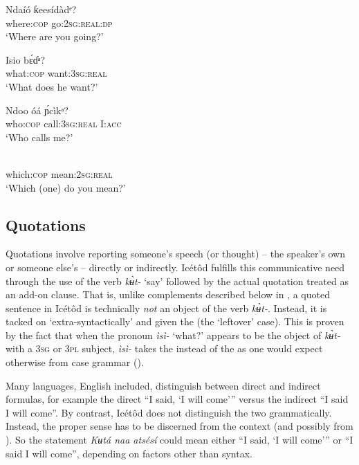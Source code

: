 \ea\label{ex:syn:48}
\gll Ndaíó   ƙeesídàdᵉ? \\
where:\textsc{cop}   go:\textsc{2sg:real:dp}    \\
\glt ‘Where are you going?’ 
\z




\ea\label{ex:syn:49}
\gll Isio     b\'{ɛ}ɗᵃ? \\
what:\textsc{cop}   want:\textsc{3sg:real}    \\
\glt ‘What does he want?’ 
\z




\ea\label{ex:syn:50}
\gll Ndoo     óá       \'{ɲ}cìkᵃ? \\
who:\textsc{cop}   call:\textsc{3sg:real}   I:\textsc{acc}    \\
\glt ‘Who calls me?’ 
\z




\ea\label{ex:syn:51}
 \\
which:\textsc{cop}   mean:\textsc{2sg:real}    \\
\glt ‘Which (one) do you mean?’ 
\z






\subsection{Quotations}\label{sec:10.5}


Quotations involve reporting someone’s speech (or thought) – the speaker’s own or someone else’s – directly or indirectly. Icétôd fulfills this communicative need through the use of the verb \textit{k\`{ʉ}t-} ‘say’ followed by the actual quotation treated as an add-on clause. That is, unlike complements described below in , a quoted sentence in Icétôd is technically \textit{not} an object of the verb \textit{k\`{ʉ}t-}. Instead, it is tacked on ‘extra-syntactically’ and given the  (the ‘leftover’ case). This is proven by the fact that when the pronoun \textit{ìsì-} ‘what?’ appears to be the object of \textit{k\`{ʉ}t-} with a \textsc{3sg} or \textsc{3pl} subject, \textit{ìsì-} takes the  instead of the  as one would expect otherwise from case grammar ().

Many languages, English included, distinguish between direct and indirect  formulas, for example the direct “I said, ‘I will come’” versus the indirect “I said I will come”. By contrast, Icétôd does not distinguish the two grammatically. Instead, the proper sense has to be discerned from the context (and possibly from ). So the statement \textit{Kʉt{\Í}á naa atsésí} could mean either “I said, ‘I will come’” or “I said I will come”, depending on factors other than syntax. 


